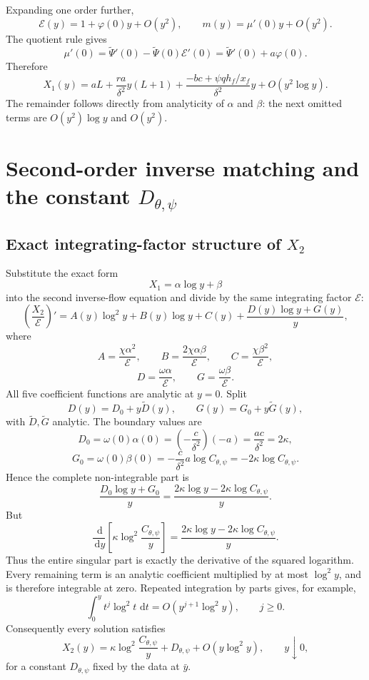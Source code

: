 \documentclass[11pt]{article}
\newcommand{\xf}{x_f}
\newcommand{\dd}{\,\mathrm{d}}
\begin{document}
Expanding one order further,
\[
\mathcal E(y)=1+\varphi(0)y+O(y^2),
\qquad
m(y)=\mu'(0)y+O(y^2).
\]
The quotient rule gives
\[
\mu'(0)=\widetilde\Psi'(0)-\widetilde\Psi(0)\mathcal E'(0)
=\widetilde\Psi'(0)+a\varphi(0).
\]
Therefore
\[
\boxed{
X_1(y)
=aL
+\frac{ra}{\delta^2}y(L+1)
+\frac{-bc+\psi qh_f/\xf}{\delta^2}y
+O(y^2\log y)}.
\]
The remainder follows directly from analyticity of \(\alpha\) and \(\beta\): the next omitted terms are \(O(y^2)\log y\) and \(O(y^2)\).

\section{Second-order inverse matching and the constant \texorpdfstring{\(D_{\theta,\psi}\)}{D}}

\subsection{Exact integrating-factor structure of \texorpdfstring{\(X_2\)}{X2}}
Substitute the exact form
\[
X_1=\alpha\log y+\beta
\]
into the second inverse-flow equation and divide by the same integrating factor \(\mathcal E\):
\[
\left(\frac{X_2}{\mathcal E}\right)'
=
A(y)\log^2y+B(y)\log y+C(y)
+\frac{D(y)\log y+G(y)}{y},
\]
where
\[
A=\frac{\chi\alpha^2}{\mathcal E},
\qquad
B=\frac{2\chi\alpha\beta}{\mathcal E},
\qquad
C=\frac{\chi\beta^2}{\mathcal E},
\]
\[
D=\frac{\omega\alpha}{\mathcal E},
\qquad
G=\frac{\omega\beta}{\mathcal E}.
\]
All five coefficient functions are analytic at \(y=0\).  Split
\[
D(y)=D_0+y\widetilde D(y),
\qquad
G(y)=G_0+y\widetilde G(y),
\]
with \(\widetilde D,\widetilde G\) analytic.  The boundary values are
\[
D_0=\omega(0)\alpha(0)
=\left(-\frac c{\delta^2}\right)(-a)
=\frac{ac}{\delta^2}
=2\kappa,
\]
\[
G_0=\omega(0)\beta(0)
=-\frac c{\delta^2}a\log C_{\theta,\psi}
=-2\kappa\log C_{\theta,\psi}.
\]
Hence the complete non-integrable part is
\[
\frac{D_0\log y+G_0}{y}
=\frac{2\kappa\log y-2\kappa\log C_{\theta,\psi}}{y}.
\]
But
\[
\boxed{
\frac{\dd}{\dd y}
\left[
\kappa\log^2\frac{C_{\theta,\psi}}{y}
\right]
=
\frac{2\kappa\log y-2\kappa\log C_{\theta,\psi}}{y}}.
\]
Thus the entire singular part is exactly the derivative of the squared logarithm.  Every remaining term is an analytic coefficient multiplied by at most \(\log^2y\), and is therefore integrable at zero.  Repeated integration by parts gives, for example,
\[
\int_0^y t^j\log^2t\,\dd t
=O(y^{j+1}\log^2y),
\qquad j\ge0.
\]
Consequently every solution satisfies
\[
\boxed{
X_2(y)
=\kappa\log^2\frac{C_{\theta,\psi}}{y}
+D_{\theta,\psi}
+O(y\log^2y)},
\qquad y\downarrow0,
\]
for a constant \(D_{\theta,\psi}\) fixed by the data at \(\bar y\).
\end{document}
